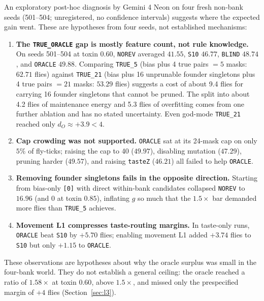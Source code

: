 An exploratory post-hoc diagnosis by Gemini 4 Neon on four fresh non-bank seeds (501--504; unregistered, no confidence intervals) suggests where the expected gain went. These are hypotheses from four seeds, not established mechanisms:
\begin{enumerate}
  \item \textbf{The \texttt{TRUE\_ORACLE} gap is mostly feature count, not rule knowledge.} On seeds 501--504 at toxin $0.60$, \texttt{NOREV} averaged $41.55$, \texttt{S10} $46.77$, \texttt{BLIND} $48.74$, and \texttt{ORACLE} $49.88$. Comparing \texttt{TRUE\_5} (bias plus 4 true pairs $=5$ masks: $62.71$ flies) against \texttt{TRUE\_21} (bias plus 16 unprunable founder singletons plus 4 true pairs $=21$ masks: $53.29$ flies) suggests a cost of about 9.4 flies for carrying 16 founder singletons that cannot be pruned. The split into about 4.2 flies of maintenance energy and 5.3 flies of overfitting comes from one further ablation and has no stated uncertainty. Even god-mode \texttt{TRUE\_21} reached only $d_O \approx +3.9 < 4$.
  \item \textbf{Cap crowding was not supported.} \texttt{ORACLE} sat at its 24-mask cap on only $5\%$ of fly-ticks; raising the cap to 40 ($49.97$), disabling mutation ($47.29$), pruning harder ($49.57$), and raising \texttt{tasteZ} ($46.21$) all failed to help \texttt{ORACLE}.
  \item \textbf{Removing founder singletons fails in the opposite direction.} Starting from bias-only \texttt{[0]} with direct within-bank candidates collapsed \texttt{NOREV} to $16.96$ (and $0$ at toxin $0.85$), inflating $g$ so much that the $1.5\times$ bar demanded more flies than \texttt{TRUE\_5} achieves.
  \item \textbf{Movement L1 compresses taste-routing margins.} In taste-only runs, \texttt{ORACLE} beat \texttt{S10} by $+5.70$ flies; enabling movement L1 added $+3.74$ flies to \texttt{S10} but only $+1.15$ to \texttt{ORACLE}.
\end{enumerate}

These observations are hypotheses about why the oracle surplus was small in the four-bank world. They do not establish a general ceiling: the oracle reached a ratio of $1.58\times$ at toxin $0.60$, above $1.5\times$, and missed only the prespecified margin of $+4$ flies (Section~\ref{sec:l3}).
